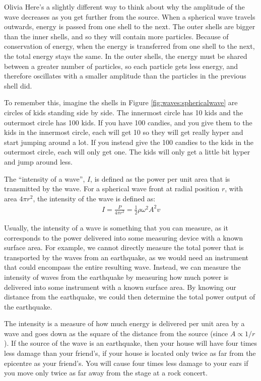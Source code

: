 \begin{studentOpinion}{Olivia}
Here's a slightly different way to think about why the amplitude of the wave decreases as you get further from the source. When a spherical wave travels outwards, energy is passed from one shell to the next. The outer shells are bigger than the inner shells, and so they will contain more particles. Because of conservation of energy, when the energy is transferred from one shell to the next, the total energy stays the same. In the outer shells, the energy must be shared between a greater number of particles, so each particle gets less energy, and therefore oscillates with a smaller amplitude than the particles in the previous shell did.

To remember this, imagine the shells in Figure \ref{fig:waves:sphericalwave} are circles of kids standing side by side. The innermost circle has 10 kids and the outermost circle has 100 kids. If you have 100 candies, and you give them to the kids in the innermost circle, each will get 10 so they will get really hyper and start jumping around a lot. If you instead give the 100 candies to the kids in the outermost circle, each will only get one. The kids will only get a little bit hyper and jump around less.
\end{studentOpinion}

The ``intensity of a wave'', $I$, is defined as the power per unit area that is transmitted by the wave. For a spherical wave front at radial position $r$, with area $4\pi r^2$, the intensity of the wave is defined as:
\begin{align*}
I = \frac{P}{4\pi r^2} = \frac{1}{2}\rho  \omega^2 A^2 v
\end{align*}

Usually, the intensity of a wave is something that you can measure, as it corresponds to the power delivered into some measuring device with a known surface area. For example, we cannot directly measure the total power that is transported by the waves from an earthquake, as we would need an instrument that could encompass the entire resulting wave. Instead, we can measure the intensity of waves from the earthquake by measuring how much power is delivered into some instrument with a known surface area. By knowing our distance from the earthquake, we could then determine the total power output of the earthquake. 

The intensity is a measure of how much energy is delivered per unit area by a wave and goes down as the square of the distance from the source (since $A\propto 1/r$). If the source of the wave is an earthquake, then your house will have four times less damage than your friend's, if your house is located only twice as far from the epicentre as your friend's. You will cause four times less damage to your ears if you move only twice as far away from the stage at a rock concert.


